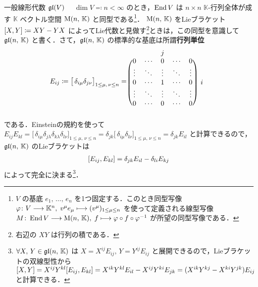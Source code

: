\documentclass[rep_main]{subfiles}
\begin{document}
\begin{myexample}[label=def:gl-alg]{一般線形代数 $\mathfrak{gl} (V)$}
    　$\dim V \eqqcolon n < \infty$ のとき，$\operatorname{End} V$ は $n \times n$ $\mathbb{K}$-行列全体が成す $\mathbb{K}$ ベクトル空間 $\mathrm{M}(n,\, \mathbb{K})$ と同型である\footnote{$V$ の基底 $e_1,\, \dots,\, e_n$ を1つ固定する．このとき同型写像 $\varphi \colon V \longrightarrow \mathbb{K}^n,\; v^\mu e_\mu \longmapsto (v^\mu)_{1 \le \mu \le n}$ を使って定義される線型写像 $M \colon \operatorname{End} V \longrightarrow \mathrm{M}(n,\, \mathbb{K}),\; f \longmapsto \varphi \circ f \circ \varphi^{-1}$ が所望の同型写像である．}．
    $\mathrm{M}(n,\, \mathbb{K})$ をLieブラケット $\comm{X}{Y} \coloneqq XY - YX$ によってLie代数と見做す\footnote{右辺の $XY$ は行列の積である．}ときは，この同型を意識して $\mathfrak{gl}(n,\, \mathbb{K})$ と書く．さて，$\mathfrak{gl}(n,\, \mathbb{K})$ の標準的な基底は所謂\textbf{行列単位}
    \begin{align}
        E_{ij} \coloneqq \bigl[\, \delta_{i\mu} \delta_{j\nu} \bigr]_{1 \le \mu,\, \nu \le n} 
        = 
        \begin{blockarray}{cccccc}
            & & j & & \\
            \begin{block}{(ccccc)c}
                0 & \cdots & 0 & \cdots & 0 & \\
                \vdots & \ddots & \vdots & \ddots & \vdots & \\
                0 & \cdots & 1 & \cdots & 0 & i \\
                \vdots & \ddots & \vdots & \ddots & \vdots & \\
                0 & \cdots & 0 & \cdots & 0 & \\
            \end{block}
        \end{blockarray}
    \end{align}
    である．Einsteinの規約を使って $E_{ij} E_{kl} = \bigl[\, \delta_{i\mu} \delta_{j\lambda} \delta_{k \lambda} \delta_{l \nu} \bigr]_{1 \le \mu,\, \nu \le n} = \delta_{jk} \bigl[\, \delta_{i\mu} \delta_{l\nu} \bigr]_{1 \le \mu,\, \nu \le n} = \delta_{jk} E_{il}$ と計算できるので，$\mathfrak{gl}(n,\, \mathbb{K})$ のLieブラケットは
    \begin{align}
        \comm{E_{ij}}{E_{kl}} = \delta_{jk} E_{il} - \delta_{li} E_{kj}
    \end{align}
    によって完全に決まる\footnote{$\forall X,\, Y \in \mathfrak{gl}(n,\, \mathbb{K})$ は $X = X^{ij} E_{ij},\, Y = Y^{ij} E_{ij}$ と展開できるので，Lieブラケットの双線型性から $\comm{X}{Y} = X^{ij} Y^{kl}\comm{E_{ij}}{E_{kl}} = X^{ik} Y^{kl} E_{il} - X^{ij}Y^{ki} E_{jk} = (X^{ik} Y^{kj} - X^{ki} Y^{jk}) E_{ij}$ と計算できる．}．
\end{myexample}
\end{document}
